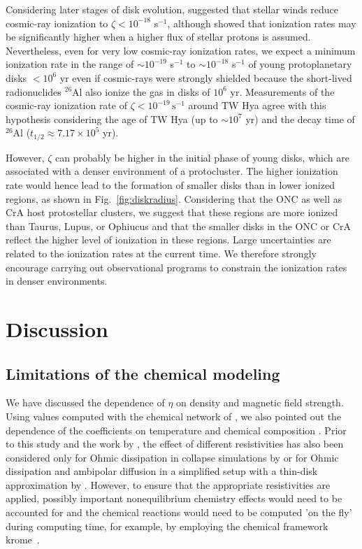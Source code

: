 \documentclass{aa}
\newcommand{\unit}[1]{\ensuremath{\, \mathrm{#1}}}
\newcommand{\krome}{{\sc krome}}          %
\newcommand{\Fig}[1]{Fig.~\ref{fig:#1}}    %
\begin{document}
Considering later stages of disk evolution, \citet{Cleeves2013} suggested that stellar winds reduce cosmic-ray ionization to $\zeta < 10^{-18}$ s$^{-1}$, although \citet{Padovani2018} showed that ionization rates may be significantly higher when a higher flux of stellar protons is assumed. 
Nevertheless, even for very low cosmic-ray ionization rates, we expect a minimum ionization rate in the range of $\sim 10^{-19}$ s$^{-1}$ to $\sim 10^{-18}$ s$^{-1}$ of young protoplanetary disks $<10^6$ yr \citep{Umebayashi2009} even if cosmic-rays were strongly shielded because the short-lived radionuclides $^{26}$Al also ionize the gas in disks of $10^6$ yr.
Measurements of the cosmic-ray ionization rate of $\zeta < 10^{-19} \unit{s}^{-1}$ around TW Hya agree with this hypothesis 
considering the age of TW Hya (up to $\sim 10^7$ yr) and the decay time of $^{26}$Al ($t_{1/2}\approx 7.17\times10^5$ yr). 

However, $\zeta$ can probably be higher in the initial phase of young disks, which are associated with a denser environment of a protocluster. The higher ionization rate would hence lead to the formation of smaller disks than in lower ionized regions, as shown in \Fig{diskradius}.
Considering that the ONC as well as CrA host protostellar clusters, we suggest that these regions are more ionized than Taurus, Lupus, or Ophiucus and that the smaller disks in the ONC or CrA reflect the higher level of ionization in these regions.
Large uncertainties are related to the ionization rates
at the current time. We therefore strongly encourage carrying out observational programs to constrain the ionization rates in denser environments.


\section{Discussion}
\subsection{Limitations of the chemical modeling}
We have discussed the dependence of $\eta$ on density and magnetic field strength. 
Using values computed with the chemical network of \citet{Zhao2016}, 
we also pointed out the dependence of the coefficients on temperature and chemical composition \citep[see also][]{Marchand2016}.
Prior to this study and the work by \citet{Wurster2018CRIRstudy}, the effect of different resistivities has also been considered only for Ohmic dissipation in collapse simulations by \citet{Machida2007} or for Ohmic dissipation and ambipolar diffusion in a simplified setup with a thin-disk approximation by \citet{Dapp2012}. 
However, to ensure that the appropriate resistivities are applied, possibly important nonequilibrium chemistry effects would need to be accounted for and the chemical reactions would need to be computed 'on the fly' during computing time,
for example, by employing the chemical framework \krome\ \citep{Grassi2014}. 
 
\end{document}
